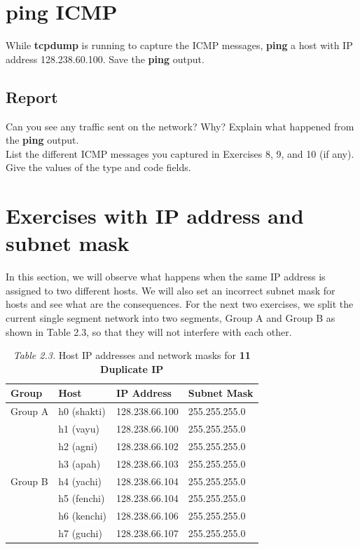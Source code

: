 \documentclass{../UTNetLab}
\begin{document}
\section{ping ICMP}
    While \textbf{tcpdump} is running to capture the ICMP messages, \textbf{ping} a host with IP address 128.238.60.100. Save the \textbf{ping} output.
    \subsection*{Report}
    Can you see any traffic sent on the network? Why? Explain what happened from the \textbf{ping} output. \\
    List the different ICMP messages you captured in Exercises 8, 9, and 10 (if any). Give the values of the type and code fields.

\section*{Exercises with IP address and subnet mask}
    In this section, we will observe what happens when the same IP address is assigned to two different hosts.
    We will also set an incorrect subnet mask for hosts and see what are the consequences.
    For the next two exercises, we split the current single segment network into two segments, Group A and Group B as shown in Table 2.3, so that they will not interfere with each other.

    \begin{table}[H]
        \caption{\textit{Table 2.3.} Host IP addresses and network masks for \textbf{11 Duplicate IP}}
        \vspace{5pt}
        \centering
        \large
        \begin{tabular}{ l l l l }
            \hline \hline
            Group & Host & IP Address & Subnet Mask \\
            \hline 
            Group A & h0 (shakti) & 128.238.66.100 & 255.255.255.0 \\
                    & h1 (vayu) & 128.238.66.100 & 255.255.255.0 \\
                    & h2 (agni) & 128.238.66.102 & 255.255.255.0 \\
                    & h3 (apah) & 128.238.66.103 & 255.255.255.0 \\
                    \hline
            Group B & h4 (yachi) & 128.238.66.104 & 255.255.255.0 \\
                    & h5 (fenchi) & 128.238.66.104 & 255.255.255.0 \\
                    & h6 (kenchi) & 128.238.66.106 & 255.255.255.0 \\
                    & h7 (guchi) & 128.238.66.107 & 255.255.255.0 \\
            \hline \hline
            \end{tabular}
    \end{table}
\end{document}
